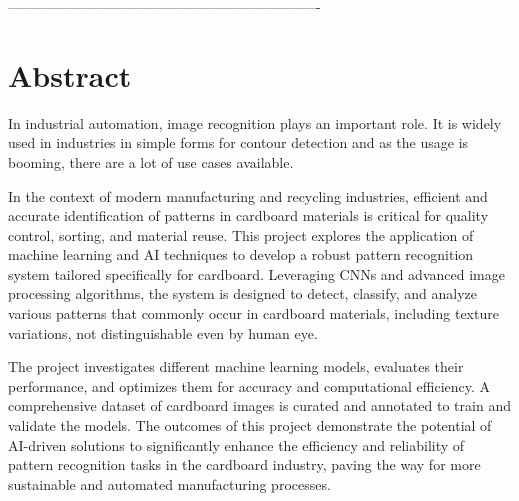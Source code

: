 -------------------------------------------------------------------
\chapter*{Abstract}

In industrial automation, image recognition plays an important role. It is widely used in industries in simple forms for contour detection and as the usage is booming, there are a lot of use cases available.

In the context of modern manufacturing and recycling industries, efficient and accurate identification of patterns in cardboard materials is critical for quality control, sorting, and material reuse. This project explores the application of machine learning and \ac{AI} techniques to develop a robust pattern recognition system tailored specifically for cardboard. Leveraging \ac{CNNs} and advanced image processing algorithms, the system is designed to detect, classify, and analyze various patterns that commonly occur in cardboard materials, including texture variations, not distinguishable even by human eye.

The project investigates different machine learning models, evaluates their performance, and optimizes them for accuracy and computational efficiency. A comprehensive dataset of cardboard images is curated and annotated to train and validate the models. The outcomes of this project demonstrate the potential of AI-driven solutions to significantly enhance the efficiency and reliability of pattern recognition tasks in the cardboard industry, paving the way for more sustainable and automated manufacturing processes.


\thispagestyle{empty}
\mbox{}
\newpage

